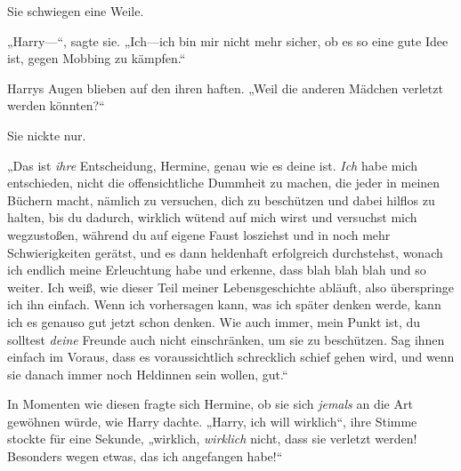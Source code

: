 Sie schwiegen eine Weile.

„Harry—“, sagte sie. „Ich—ich bin mir nicht mehr sicher, ob es so eine gute Idee ist, gegen Mobbing zu kämpfen.“

Harrys Augen blieben auf den ihren haften. „Weil die anderen Mädchen verletzt werden könnten?“

Sie nickte nur.

„Das ist \emph{ihre} Entscheidung, Hermine, genau wie es deine ist. \emph{Ich} habe mich entschieden, nicht die offensichtliche Dummheit zu machen, die jeder in meinen Büchern macht, nämlich zu versuchen, dich zu beschützen und dabei hilflos zu halten, bis du dadurch, wirklich wütend auf mich wirst und versuchst mich wegzustoßen, während du auf eigene Faust losziehst und in noch mehr Schwierigkeiten gerätst, und es dann heldenhaft erfolgreich durchstehst, wonach ich endlich meine Erleuchtung habe und erkenne, dass blah blah blah und so weiter. Ich weiß, wie dieser Teil meiner Lebensgeschichte abläuft, also überspringe ich ihn einfach. Wenn ich vorhersagen kann, was ich später denken werde, kann ich es genauso gut jetzt schon denken. Wie auch immer, mein Punkt ist, du solltest \emph{deine} Freunde auch nicht einschränken, um sie zu beschützen. Sag ihnen einfach im Voraus, dass es voraussichtlich schrecklich schief gehen wird, und wenn sie danach immer noch Heldinnen sein wollen, gut.“

In Momenten wie diesen fragte sich Hermine, ob sie sich \emph{jemals} an die Art gewöhnen würde, wie Harry dachte. „Harry, ich will wirklich“, ihre Stimme stockte für eine Sekunde, „wirklich, \emph{wirklich} nicht, dass sie verletzt werden! Besonders wegen etwas, das ich angefangen habe!“

